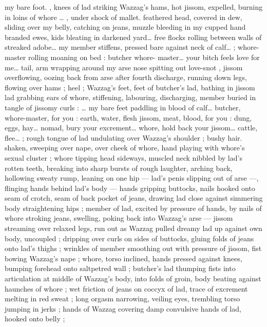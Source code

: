 my bare foot. {\gr}, knees of lad striking Wazzag's hams, hot jissom, 
expelled, burning in loins of whore {\ldots} {\gl}, under shock of mallet. 
feathered head, covered in dew, sliding over my belly, catching on 
jeans, muzzle bleeding in my cupped hand{\td} branded ewes, kids 
bleating in darkened yard{\ldots} free flocks rolling between walls of 
streaked adobe{\ldots} my member stiffens, pressed bare against neck of 
calf{\ldots}{\gr} ; whore-master rolling moaning on bed : {\gl} butcher{\td} whore- 
master{\ldots} your bitch feels love for me{\ldots} tail, arm wrapping around my 
arse{\td} nose spitting out love-snot{\td} {\gr}, jissom overflowing, oozing back 
from arse after fourth discharge, running down legs, flowing over 
hams ; heel ; Wazzag's feet, feet of butcher's lad, bathing in jissom 
lad grabbing ears of whore, stiffening, labouring, discharging, 
member buried in tangle of jissomy curls : {\gl}{\ldots} my bare feet paddling 
in blood of calf{\ldots} butcher, whore-master, for you : earth, water, flesh 
jissom, meat, blood, for you : dung, eggs, hay{\ldots} nomad, bury your 
excrement{\ldots} whore, hold back your jissom{\ldots} cattle, flee{\ldots} {\gr} ; rough 
tongue of lad undulating over Wazzag's shoulder ; bushy hair. 
shaken, sweeping over nape, over cheek of whore, hand playing with 
whore's sexual cluster ; whore tipping head sideways, muscled neck 
nibbled by lad's rotten teeth, breaking into sharp bursts of rough 
laughter, arching back, hollowing sweaty rump, leaning on one hip --- 
lad's penis slipping out of arse ---, flinging hands behind lad's body 
--- hands gripping buttocks, nails hooked onto seam of crotch, seam 
of back pocket of jeans, drawing lad close against simmering body 
straightening hips ; member of lad, excited by pressure of hands, by 
nails of whore stroking jeans, swelling, poking back into Wazzag's 
arse --- jissom streaming over relaxed legs, run out as Wazzag pulled 
dreamy lad up against own body, uncoupled ; dripping over curls on 
sides of buttocks, gluing folds of jeans onto lad's thighs ; wrinkles 
of member smoothing out with pressure of jissom, fist bowing 
Wazzag's nape ; whore, torso inclined, hands pressed against knees, 
bumping forehead onto saltpetred wall ; butcher's lad thumping fists 
into articulation at middle of Wazzag's body, into folds of groin, body 
beating against haunches of whore ; wet friction of jeans on coccyx 
of lad, trace of excrement melting in red sweat ; long orgasm 
narrowing, veiling eyes, trembling torso jumping in jerks ; hands of 
Wazzag covering damp convulsive hands of lad, hooked onto belly ; 
